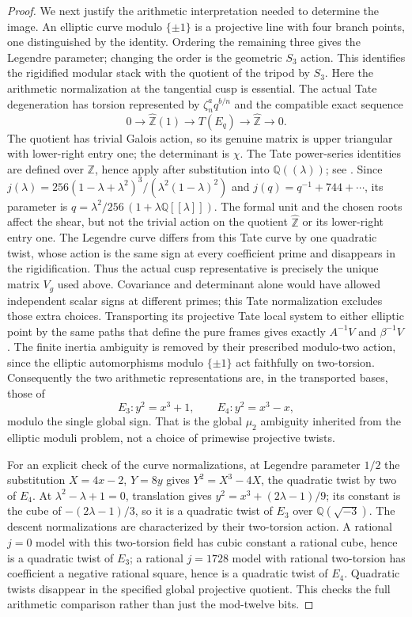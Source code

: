 \begin{proof}
We next justify the arithmetic interpretation needed
to determine the image. An elliptic curve modulo
$\{\pm1\}$ is a projective line with four branch
points, one distinguished by the identity. Ordering
the remaining three gives the Legendre parameter;
changing the order is the geometric $S_3$ action.
This identifies the rigidified modular stack with
the quotient of the tripod by $S_3$.
Here the arithmetic normalization at the tangential
cusp is essential. The actual Tate degeneration has
torsion represented by $\zeta_n^a q^{b/n}$ and the
compatible exact sequence
\[
 0\longrightarrow\widehat{\mathbb Z}(1)
 \longrightarrow T(E_q)
 \longrightarrow\widehat{\mathbb Z}\longrightarrow0.
\]
The quotient has trivial Galois action, so its genuine
matrix is upper triangular with lower-right entry one;
the determinant is $\chi$. The Tate power-series
identities are defined over $\mathbb Z$, hence apply
after substitution into $\mathbb Q((\lambda))$;
see \cite[III, \S3, equations (23)--(26), pp.~102--103]
{PBC_MilneEC2021}. Since
$j(\lambda)=256(1-\lambda+\lambda^2)^3/
(\lambda^2(1-\lambda)^2)$ and
$j(q)=q^{-1}+744+\cdots$, its parameter is
$q=\lambda^2/256\,(1+\lambda\mathbb Q[[\lambda]])$.
The formal unit and the chosen roots affect the shear,
but not the trivial action on the quotient
$\widehat{\mathbb Z}$ or its lower-right entry one.
The Legendre curve differs from this Tate curve by
one quadratic twist, whose action is the same sign
at every coefficient prime and disappears in the
rigidification. Thus the actual cusp representative
is precisely the unique matrix $V_g$ used above.
Covariance and determinant alone would have allowed
independent scalar signs at different primes; this
Tate normalization excludes those extra choices.
Transporting
its projective Tate local system to either elliptic
point by the same paths that define the pure frames
gives exactly $A^{-1}V$ and $\beta^{-1}V$.
The finite inertia ambiguity is removed by their
prescribed modulo-two action, since the elliptic
automorphisms modulo $\{\pm1\}$ act faithfully on
two-torsion. Consequently the two arithmetic
representations are, in the transported bases, those of
\[
       E_3:y^2=x^3+1,\qquad E_4:y^2=x^3-x,
 \tag{C.20.4}
\]
modulo the single global sign.
That is the global $\mu_2$ ambiguity inherited from
the elliptic moduli problem, not a choice of
primewise projective twists.

For an explicit check of the curve normalizations,
at Legendre parameter $1/2$ the substitution
$X=4x-2$, $Y=8y$ gives $Y^2=X^3-4X$, the
quadratic twist by two of $E_4$. At
$\lambda^2-\lambda+1=0$, translation gives
$y^2=x^3+(2\lambda-1)/9$; its constant is the
cube of $-(2\lambda-1)/3$, so it is a quadratic
twist of $E_3$ over $\mathbb Q(\sqrt{-3})$.
The descent normalizations are characterized by
their two-torsion action. A rational $j=0$ model
with this two-torsion field has cubic constant
a rational cube, hence is a quadratic twist of
$E_3$; a rational $j=1728$ model with rational
two-torsion has coefficient a negative rational
square, hence is a quadratic twist of $E_4$.
Quadratic twists disappear in the specified global
projective quotient. This checks the full arithmetic
comparison rather than just the mod-twelve bits.


\end{proof}
